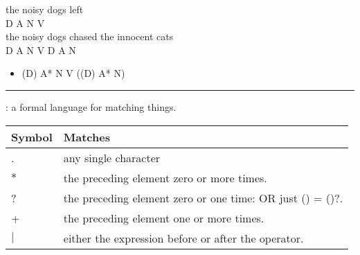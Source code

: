 \documentclass[a4paper,landscape,headrule,footrule]{foils}
\begin{document}
\begin{exe}
  \ex \gll the noisy dogs left \\
  D A N V \\ 
  \ex  \gll the noisy dogs chased the innocent cats \\
 D A N V D A N \\
\end{exe}
\begin{itemize}
\item (D) A* N V ((D) A* N)
\end{itemize}
\hrule
{}: a formal language for matching things.
\\[2ex]
 \begin{tabular}{ll}
    Symbol & Matches \\ \hline
    . & any single character\\
    $*$ &	the preceding element zero or more times. \\
    ? &	 the preceding element zero or one time: OR just () = ()?. \\
    + &	 the preceding element one or more times. \\
    $|$ &  either the expression before or after the operator. \\
  \end{tabular}










\end{document}
